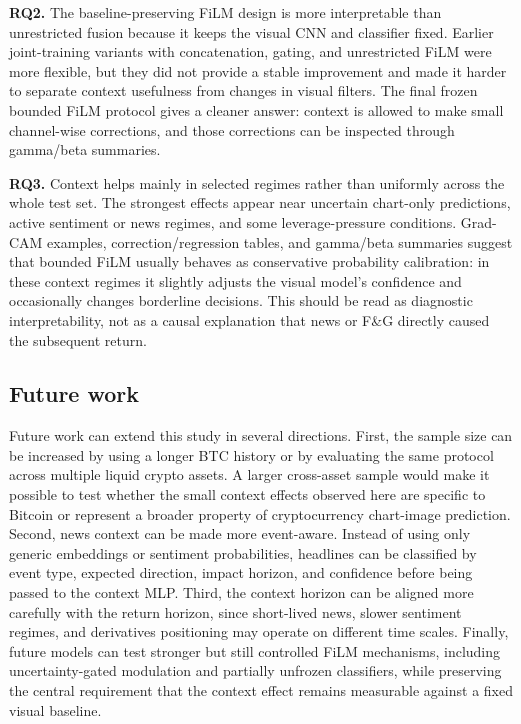 \documentclass[14pt,a4paper]{extarticle}
\begin{document}
\textbf{RQ2.} The baseline-preserving FiLM design is more interpretable than unrestricted fusion because it keeps the visual CNN and classifier fixed. Earlier joint-training variants with concatenation, gating, and unrestricted FiLM were more flexible, but they did not provide a stable improvement and made it harder to separate context usefulness from changes in visual filters. The final frozen bounded FiLM protocol gives a cleaner answer: context is allowed to make small channel-wise corrections, and those corrections can be inspected through gamma/beta summaries.

\textbf{RQ3.} Context helps mainly in selected regimes rather than uniformly across the whole test set. The strongest effects appear near uncertain chart-only predictions, active sentiment or news regimes, and some leverage-pressure conditions. Grad-CAM examples, correction/regression tables, and gamma/beta summaries suggest that bounded FiLM usually behaves as conservative probability calibration: in these context regimes it slightly adjusts the visual model's confidence and occasionally changes borderline decisions. This should be read as diagnostic interpretability, not as a causal explanation that news or F\&G directly caused the subsequent return.

\subsection{Future work}

Future work can extend this study in several directions. First, the sample size can be increased by using a longer BTC history or by evaluating the same protocol across multiple liquid crypto assets. A larger cross-asset sample would make it possible to test whether the small context effects observed here are specific to Bitcoin or represent a broader property of cryptocurrency chart-image prediction. Second, news context can be made more event-aware. Instead of using only generic embeddings or sentiment probabilities, headlines can be classified by event type, expected direction, impact horizon, and confidence before being passed to the context MLP. Third, the context horizon can be aligned more carefully with the return horizon, since short-lived news, slower sentiment regimes, and derivatives positioning may operate on different time scales. Finally, future models can test stronger but still controlled FiLM mechanisms, including uncertainty-gated modulation and partially unfrozen classifiers, while preserving the central requirement that the context effect remains measurable against a fixed visual baseline.
\end{document}
